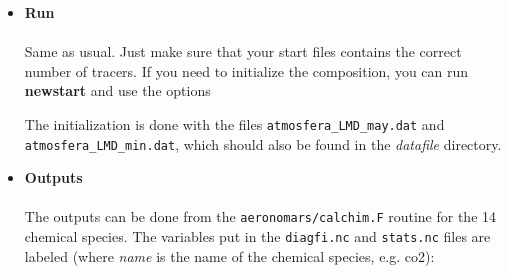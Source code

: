 \begin{itemize}
\item {\bf Run} \\ \\
Same as usual. Just make sure that your start files contains the correct number
of tracers. If you need to initialize the composition, you can run
{\bf newstart} and use the options 
The initialization is done with the files {\tt atmosfera\_LMD\_may.dat} and 
{\tt atmosfera\_LMD\_min.dat}, which should also be found in the 
{\it datafile} directory.

\item {\bf Outputs} \\ \\
The outputs can be done from the {\tt aeronomars/calchim.F} routine for the 14
chemical species. The variables put in the {\tt diagfi.nc} and 
{\tt stats.nc} files are
labeled (where {\it name} is the name of the chemical species, e.g. co2):

\end{itemize}



